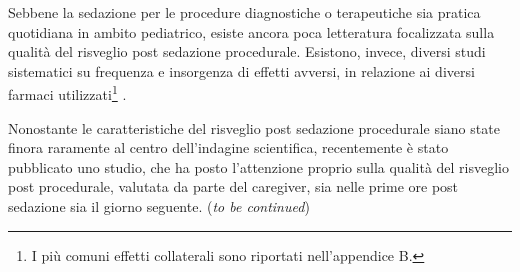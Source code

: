 Sebbene la sedazione per le procedure diagnostiche o terapeutiche sia pratica quotidiana in ambito pediatrico, esiste ancora poca letteratura focalizzata sulla qualità del risveglio post sedazione procedurale. Esistono, invece, diversi studi sistematici su frequenza e insorgenza di effetti avversi, in relazione ai diversi farmaci utilizzati\footnote{I più comuni effetti collaterali sono riportati nell'appendice B.} \citep{Bellolio2016}.

\bigskip

Nonostante le caratteristiche del risveglio post sedazione procedurale siano state finora raramente al centro dell'indagine scientifica, recentemente è stato pubblicato uno studio, che ha posto l'attenzione proprio sulla qualità del risveglio post procedurale, valutata da parte del caregiver, sia nelle prime ore post sedazione sia il giorno seguente. (\emph{to be continued}) %




